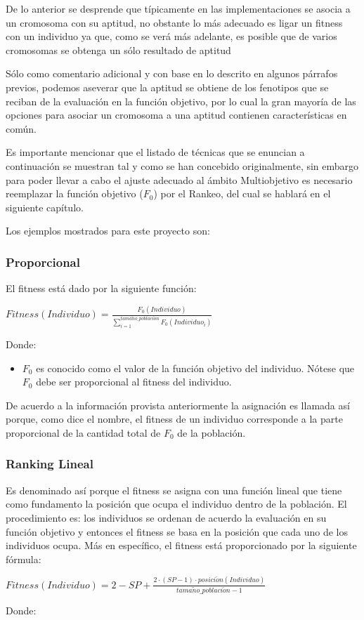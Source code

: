 \documentclass[class=report, crop=false]{standalone}
\begin{document}
De lo anterior se desprende que típicamente en las implementaciones
se asocia a un cromosoma con su aptitud, no obstante lo más adecuado
es ligar un fitness con un individuo ya que, como se verá más adelante,
es posible que de varios cromosomas se obtenga un sólo resultado de aptitud 

Sólo como comentario adicional y con base en lo descrito en algunos 
párrafos previos, podemos aseverar que la aptitud se obtiene de los
fenotipos que se reciban de la evaluación en la función objetivo, por lo cual
la gran mayoría de las opciones para asociar un cromosoma 
a una aptitud contienen características en común. 

Es importante mencionar que el listado de técnicas que se 
enuncian a continuación se muestran tal y como se han concebido 
originalmente, sin embargo para poder llevar a cabo el ajuste 
adecuado al ámbito Multiobjetivo es necesario reemplazar la 
función objetivo ($F_0$) por el Rankeo, del cual se hablará 
en el siguiente capítulo.\medskip\break

Los ejemplos mostrados para este proyecto son:

\subsubsection{Proporcional}
El fitness está dado por la siguiente función:\medskip\break
\centerline{$Fitness(Individuo) = \frac{F_0(Individuo)}{\sum_{i=1}^{tama\tilde{n}o\_poblaci\acute{o}n}F_0(Individuo_i)}$}\medskip\break
Donde:

\begin{itemize}
\item $F_0$ es conocido como el valor de la función objetivo del 
individuo. Nótese que $F_0$ debe ser proporcional al fitness del 
individuo.
\end{itemize}

De acuerdo a la información provista anteriormente la asignación 
es llamada así porque, como dice el nombre, el fitness de un 
individuo corresponde a la parte proporcional de la cantidad 
total de $F_0$ de la población.

\subsubsection{Ranking Lineal}
Es denominado así porque el fitness se asigna con una función 
lineal que tiene como fundamento la posición que ocupa el 
individuo dentro de la población.\break
El procedimiento es: los individuos se ordenan de acuerdo 
la evaluación en su función objetivo y entonces el fitness 
se basa en la posición que cada uno de los individuos ocupa. 
Más en específico, el fitness está proporcionado por la 
siguiente fórmula:\medskip\break
\centerline{$Fitness(Individuo) = 2 - SP + \frac{2 \cdot (SP - 1) \cdot posici\acute{o}n(Individuo)}{tama\tilde{n}o\_poblaci\acute{o}n - 1}$}\medskip\break
Donde:
\end{document}
